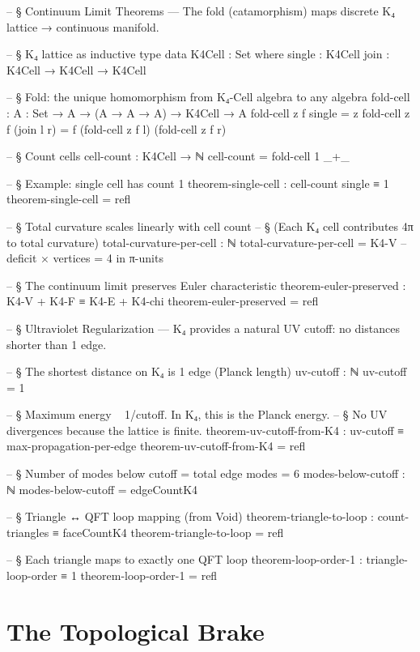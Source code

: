 \documentclass[11pt,a4paper]{book}
\begin{document}
\begin{code}
-- § Continuum Limit Theorems — The fold (catamorphism) maps discrete K₄ lattice → continuous manifold.

-- § K₄ lattice as inductive type
data K4Cell : Set where
  single : K4Cell
  join : K4Cell → K4Cell → K4Cell

-- § Fold: the unique homomorphism from K₄-Cell algebra to any algebra
fold-cell : {A : Set} → A → (A → A → A) → K4Cell → A
fold-cell z f single = z
fold-cell z f (join l r) = f (fold-cell z f l) (fold-cell z f r)

-- § Count cells
cell-count : K4Cell → ℕ
cell-count = fold-cell 1 _+_

-- § Example: single cell has count 1
theorem-single-cell : cell-count single ≡ 1
theorem-single-cell = refl

-- § Total curvature scales linearly with cell count
-- § (Each K₄ cell contributes 4π to total curvature)
total-curvature-per-cell : ℕ
total-curvature-per-cell = K4-V  -- deficit × vertices = 4 in π-units

-- § The continuum limit preserves Euler characteristic
theorem-euler-preserved : K4-V + K4-F ≡ K4-E + K4-chi
theorem-euler-preserved = refl

-- § Ultraviolet Regularization — K₄ provides a natural UV cutoff: no distances shorter than 1 edge.

-- § The shortest distance on K₄ is 1 edge (Planck length)
uv-cutoff : ℕ
uv-cutoff = 1

-- § Maximum energy ~ 1/cutoff. In K₄, this is the Planck energy.
-- § No UV divergences because the lattice is finite.
theorem-uv-cutoff-from-K4 : uv-cutoff ≡ max-propagation-per-edge
theorem-uv-cutoff-from-K4 = refl

-- § Number of modes below cutoff = total edge modes = 6
modes-below-cutoff : ℕ
modes-below-cutoff = edgeCountK4

-- § Triangle ↔ QFT loop mapping (from Void)
theorem-triangle-to-loop : count-triangles ≡ faceCountK4
theorem-triangle-to-loop = refl

-- § Each triangle maps to exactly one QFT loop
theorem-loop-order-1 : triangle-loop-order ≡ 1
theorem-loop-order-1 = refl
\end{code}

\chapter{The Topological Brake}
\label{ch:topological-brake}
\end{document}
